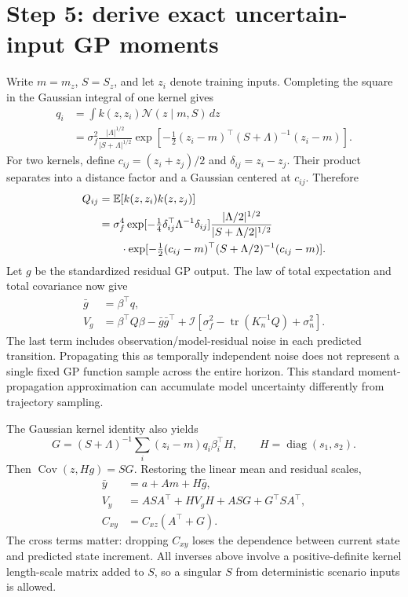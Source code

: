 \documentclass[11pt,a4paper]{article}
\newcommand{\E}{\mathbb{E}}\newcommand{\Cov}{\operatorname{Cov}}\newcommand{\Var}{\operatorname{Var}}
\begin{document}
\section{Step 5: derive exact uncertain-input GP moments}
Write $m=m_z$, $S=S_z$, and let $z_i$ denote training inputs. Completing the square in the Gaussian integral of one kernel gives
\begin{align}
 q_i&=\int k(z,z_i)\mathcal N(z\mid m,S)\,dz\\
 &=\sigma_f^2\frac{|\Lambda|^{1/2}}{|S+\Lambda|^{1/2}}
 \exp\left[-\tfrac12(z_i-m)^\top(S+\Lambda)^{-1}(z_i-m)\right].
\end{align}
For two kernels, define $c_{ij}=(z_i+z_j)/2$ and $\delta_{ij}=z_i-z_j$. Their product separates into a distance factor and a Gaussian centered at $c_{ij}$. Therefore
\begin{align}
 Q_{ij}&=\E[k(z,z_i)k(z,z_j)]\\
 &=\sigma_f^4\exp[-\tfrac14\delta_{ij}^\top\Lambda^{-1}\delta_{ij}]
 \frac{|\Lambda/2|^{1/2}}{|S+\Lambda/2|^{1/2}}\nonumber\\
 &\hspace{7mm}\cdot\exp[-\tfrac12(c_{ij}-m)^\top(S+\Lambda/2)^{-1}(c_{ij}-m)].
\end{align}
Let $g$ be the standardized residual GP output. The law of total expectation and total covariance now give
\begin{align}
 \bar g&=\beta^\top q,\\
 V_g&=\beta^\top Q\beta-\bar g\bar g^\top+
 \mathcal I\left[\sigma_f^2-\operatorname{tr}(K_n^{-1}Q)+\sigma_n^2\right].
\end{align}
The last term includes observation/model-residual noise in each predicted transition. Propagating this as temporally independent noise does not represent a single fixed GP function sample across the entire horizon. This standard moment-propagation approximation can accumulate model uncertainty differently from trajectory sampling.

The Gaussian kernel identity also yields
\begin{equation}
 G=(S+\Lambda)^{-1}\sum_i(z_i-m)q_i\beta_i^\top H,
 \qquad H=\operatorname{diag}(s_1,s_2).
\end{equation}
Then $\Cov(z,Hg)=SG$. Restoring the linear mean and residual scales,
\begin{align}
 \bar y&=a+Am+H\bar g,\\
 V_y&=ASA^\top+HV_gH+ASG+G^\top SA^\top,\\
 C_{xy}&=C_{xz}(A^\top+G).
\end{align}
The cross terms matter: dropping $C_{xy}$ loses the dependence between current state and predicted state increment. All inverses above involve a positive-definite kernel length-scale matrix added to $S$, so a singular $S$ from deterministic scenario inputs is allowed.
\end{document}

